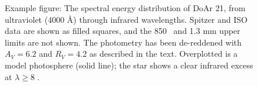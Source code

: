 \documentclass{knac}
\begin{document}



\begin{figure}[bht]
\centering
\caption{Example figure: The spectral energy distribution of DoAr 21,
  from ultraviolet (4000 \AA) through infrared wavelengths. Spitzer and ISO data
  are shown as filled squares, and the 850 \micron\ and 1.3 mm
  upper limits are not shown.  The photometry has been de-reddened
  with $A_V = 6.2$ and $R_V = 4.2$ as described in the text.
  Overplotted is a model photosphere (solid line); the star shows a
  clear infrared excess at $\lambda \ge 8$ \micron.}
\label{figure:sed}
\end{figure}


\end{document}
